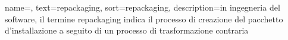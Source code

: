 







{
name=,
text=repackaging,
sort=repackaging,
description={in ingegneria del software, il termine repackaging indica il processo di creazione del pacchetto d'installazione a seguito di un processo di trasformazione contraria}
}

